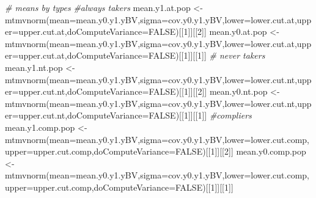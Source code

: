 \documentclass[
]{book}
\newenvironment{Shaded}{\begin{snugshade}}{\end{snugshade}}
\newcommand{\AttributeTok}[1]{\textcolor[rgb]{0.77,0.63,0.00}{#1}}
\newcommand{\CommentTok}[1]{\textcolor[rgb]{0.56,0.35,0.01}{\textit{#1}}}
\newcommand{\ConstantTok}[1]{\textcolor[rgb]{0.00,0.00,0.00}{#1}}
\newcommand{\DecValTok}[1]{\textcolor[rgb]{0.00,0.00,0.81}{#1}}
\newcommand{\FunctionTok}[1]{\textcolor[rgb]{0.00,0.00,0.00}{#1}}
\newcommand{\NormalTok}[1]{#1}
\newcommand{\OtherTok}[1]{\textcolor[rgb]{0.56,0.35,0.01}{#1}}
\theoremstyle{definition}
\theoremstyle{definition}
\theoremstyle{definition}
\theoremstyle{definition}
\theoremstyle{remark}
\begin{document}
\begin{Shaded}
\begin{Highlighting}[]
\CommentTok{\# means by types}
\CommentTok{\#always takers}
\NormalTok{mean.y1.at.pop }\OtherTok{\textless{}{-}} \FunctionTok{mtmvnorm}\NormalTok{(}\AttributeTok{mean=}\NormalTok{mean.y0.y1.yBV,}\AttributeTok{sigma=}\NormalTok{cov.y0.y1.yBV,}\AttributeTok{lower=}\NormalTok{lower.cut.at,}\AttributeTok{upper=}\NormalTok{upper.cut.at,}\AttributeTok{doComputeVariance=}\ConstantTok{FALSE}\NormalTok{)[[}\DecValTok{1}\NormalTok{]][[}\DecValTok{2}\NormalTok{]]}
\NormalTok{mean.y0.at.pop }\OtherTok{\textless{}{-}} \FunctionTok{mtmvnorm}\NormalTok{(}\AttributeTok{mean=}\NormalTok{mean.y0.y1.yBV,}\AttributeTok{sigma=}\NormalTok{cov.y0.y1.yBV,}\AttributeTok{lower=}\NormalTok{lower.cut.at,}\AttributeTok{upper=}\NormalTok{upper.cut.at,}\AttributeTok{doComputeVariance=}\ConstantTok{FALSE}\NormalTok{)[[}\DecValTok{1}\NormalTok{]][[}\DecValTok{1}\NormalTok{]]}
\CommentTok{\# never takers}
\NormalTok{mean.y1.nt.pop }\OtherTok{\textless{}{-}} \FunctionTok{mtmvnorm}\NormalTok{(}\AttributeTok{mean=}\NormalTok{mean.y0.y1.yBV,}\AttributeTok{sigma=}\NormalTok{cov.y0.y1.yBV,}\AttributeTok{lower=}\NormalTok{lower.cut.nt,}\AttributeTok{upper=}\NormalTok{upper.cut.nt,}\AttributeTok{doComputeVariance=}\ConstantTok{FALSE}\NormalTok{)[[}\DecValTok{1}\NormalTok{]][[}\DecValTok{2}\NormalTok{]]}
\NormalTok{mean.y0.nt.pop }\OtherTok{\textless{}{-}} \FunctionTok{mtmvnorm}\NormalTok{(}\AttributeTok{mean=}\NormalTok{mean.y0.y1.yBV,}\AttributeTok{sigma=}\NormalTok{cov.y0.y1.yBV,}\AttributeTok{lower=}\NormalTok{lower.cut.nt,}\AttributeTok{upper=}\NormalTok{upper.cut.nt,}\AttributeTok{doComputeVariance=}\ConstantTok{FALSE}\NormalTok{)[[}\DecValTok{1}\NormalTok{]][[}\DecValTok{1}\NormalTok{]]}
\CommentTok{\#compliers}
\NormalTok{mean.y1.comp.pop }\OtherTok{\textless{}{-}} \FunctionTok{mtmvnorm}\NormalTok{(}\AttributeTok{mean=}\NormalTok{mean.y0.y1.yBV,}\AttributeTok{sigma=}\NormalTok{cov.y0.y1.yBV,}\AttributeTok{lower=}\NormalTok{lower.cut.comp,}\AttributeTok{upper=}\NormalTok{upper.cut.comp,}\AttributeTok{doComputeVariance=}\ConstantTok{FALSE}\NormalTok{)[[}\DecValTok{1}\NormalTok{]][[}\DecValTok{2}\NormalTok{]]}
\NormalTok{mean.y0.comp.pop }\OtherTok{\textless{}{-}} \FunctionTok{mtmvnorm}\NormalTok{(}\AttributeTok{mean=}\NormalTok{mean.y0.y1.yBV,}\AttributeTok{sigma=}\NormalTok{cov.y0.y1.yBV,}\AttributeTok{lower=}\NormalTok{lower.cut.comp,}\AttributeTok{upper=}\NormalTok{upper.cut.comp,}\AttributeTok{doComputeVariance=}\ConstantTok{FALSE}\NormalTok{)[[}\DecValTok{1}\NormalTok{]][[}\DecValTok{1}\NormalTok{]]}


\end{Highlighting}
\end{Shaded}
\end{document}
